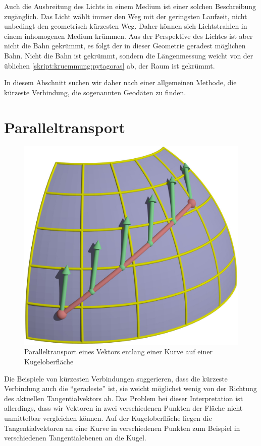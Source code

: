 Auch die Ausbreitung des Lichts in einem Medium ist einer solchen
Beschreibung zugänglich.
Das Licht wählt immer den Weg mit der geringsten Laufzeit, nicht
unbedingt den geometrisch kürzesten Weg.
Daher können sich Lichtstrahlen in einem inhomogenen Medium
krümmen.
Aus der Perspektive des Lichtes ist aber nicht die Bahn gekrümmt,
es folgt der in dieser Geometrie geradest möglichen Bahn.
Nicht die Bahn ist gekrümmt, sondern die Längenmessung weicht von
der üblichen \eqref{skript:kruemmung:pytagoras} ab, der Raum ist
gekrümmt.

In diesem Abschnitt suchen wir daher nach einer allgemeinen Methode,
die kürzeste Verbindung, die sogenannten Geodäten zu finden.

\section{Paralleltransport}
\begin{figure}
\centering
\includegraphics[width=\hsize]{chapters/3d/transport.jpg}
\caption{Paralleltransport eines Vektors entlang einer Kurve auf
einer Kugeloberfläche%
\label{skript:geodaten:fig:transport}}
\end{figure}
Die Beispiele von kürzesten Verbindungen suggerieren, dass die kürzeste
Verbindung auch die ``geradeste'' ist, sie weicht möglichst wenig von
der Richtung des aktuellen Tangentialvektors ab.
Das Problem bei dieser Interpretation ist allerdings, dass wir Vektoren
in zwei verschiedenen Punkten der Fläche nicht unmittelbar vergleichen
können.
Auf der Kugeloberfläche liegen die Tangentialvektoren an eine Kurve in
verschiedenen Punkten zum Beispiel in verschiedenen Tangentialebenen
an die Kugel.

